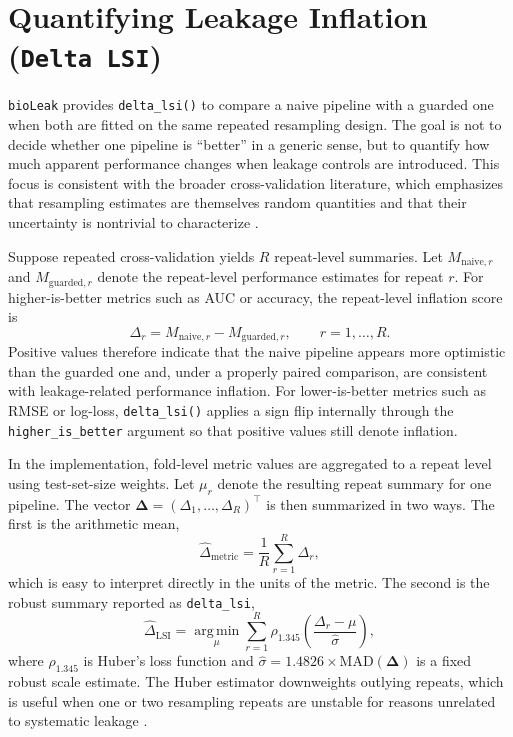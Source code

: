 \documentclass[article]{jss}
\begin{document}
\section[Quantifying Leakage Inflation (Delta LSI)]{Quantifying Leakage Inflation (\texttt{Delta LSI})}

\texttt{bioLeak} provides \texttt{delta\_lsi()} to compare a naive pipeline
with a guarded one when both are fitted on the same repeated resampling design.
The goal is not to decide whether one pipeline is ``better'' in a generic
sense, but to quantify how much apparent performance changes when leakage
controls are introduced. This focus is consistent with the broader
cross-validation literature, which emphasizes that resampling estimates are
themselves random quantities and that their uncertainty is nontrivial to
characterize \citep{bengio2004, bates2024}.

Suppose repeated cross-validation yields $R$ repeat-level summaries. Let
$M_{\mathrm{naive},r}$ and $M_{\mathrm{guarded},r}$ denote the repeat-level
performance estimates for repeat $r$. For higher-is-better metrics such as AUC
or accuracy, the repeat-level inflation score is
\[
\Delta_r = M_{\mathrm{naive},r} - M_{\mathrm{guarded},r}, \qquad r = 1, \ldots, R.
\]
Positive values therefore indicate that the naive pipeline appears more optimistic than the guarded one and, under a properly paired comparison, are consistent with leakage-related performance inflation. For lower-is-better metrics such as RMSE or log-loss, \texttt{delta\_lsi()} applies a sign flip internally through
the \texttt{higher\_is\_better} argument so that positive values still denote
inflation.

In the implementation, fold-level metric values are aggregated to a repeat
level using test-set-size weights. Let $\mu_r$ denote the resulting repeat
summary for one pipeline. The vector
$\boldsymbol{\Delta} = (\Delta_1, \ldots, \Delta_R)^\top$ is then summarized in
two ways. The first is the arithmetic mean,
\[
\widehat{\Delta}_{\mathrm{metric}} =
\frac{1}{R} \sum_{r=1}^{R} \Delta_r,
\]
which is easy to interpret directly in the units of the metric. The second is
the robust summary reported as \texttt{delta\_lsi},
\[
\widehat{\Delta}_{\mathrm{LSI}} =
\operatorname*{arg\,min}_{\mu} \sum_{r=1}^{R}
\rho_{1.345} \left( \frac{\Delta_r - \mu}{\widehat{\sigma}} \right),
\]
where $\rho_{1.345}$ is Huber's loss function and
$\widehat{\sigma} = 1.4826 \times \mathrm{MAD}(\boldsymbol{\Delta})$ is a fixed
robust scale estimate. The Huber estimator downweights outlying repeats, which
is useful when one or two resampling repeats are unstable for reasons unrelated
to systematic leakage \citep{huber1964, huber2009}.
\end{document}
